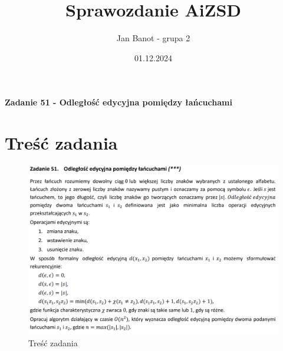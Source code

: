 \documentclass{article}
\title{Sprawozdanie AiZSD}
\author{Jan Banot - grupa 2}
\date{01.12.2024}
\begin{document}
\maketitle

\begin{center}
    \textbf{Zadanie 51 - Odległość edycyjna pomiędzy łańcuchami}
\end{center}

\section{Treść zadania}
\begin{figure}[H]
    \centering
    \includegraphics[width=\textwidth]{zadanie51.png}
    \caption{Treść zadania}
    \label{fig:sample}
\end{figure}







\printbibliography
\end{document}
